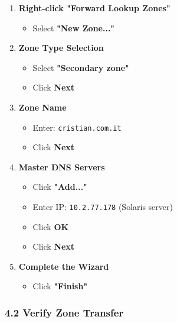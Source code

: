 \begin{enumerate}
\def\labelenumi{\arabic{enumi}.}
\tightlist
\item
  \textbf{Right-click "Forward Lookup Zones"}

  \begin{itemize}
  \tightlist
  \item
    Select \textbf{"New Zone..."}
  \end{itemize}
\item
  \textbf{Zone Type Selection}

  \begin{itemize}
  \tightlist
  \item
    Select \textbf{"Secondary zone"}
  \item
    Click \textbf{Next}
  \end{itemize}
\item
  \textbf{Zone Name}

  \begin{itemize}
  \tightlist
  \item
    Enter: \texttt{cristian.com.it}
  \item
    Click \textbf{Next}
  \end{itemize}
\item
  \textbf{Master DNS Servers}

  \begin{itemize}
  \tightlist
  \item
    Click \textbf{"Add..."}
  \item
    Enter IP: \texttt{10.2.77.178} (Solaris server)
  \item
    Click \textbf{OK}
  \item
    Click \textbf{Next}
  \end{itemize}
\item
  \textbf{Complete the Wizard}

  \begin{itemize}
  \tightlist
  \item
    Click \textbf{"Finish"}
  \end{itemize}
\end{enumerate}

\subsubsection{4.2 Verify Zone Transfer}\label{verify-zone-transfer-cristian}

